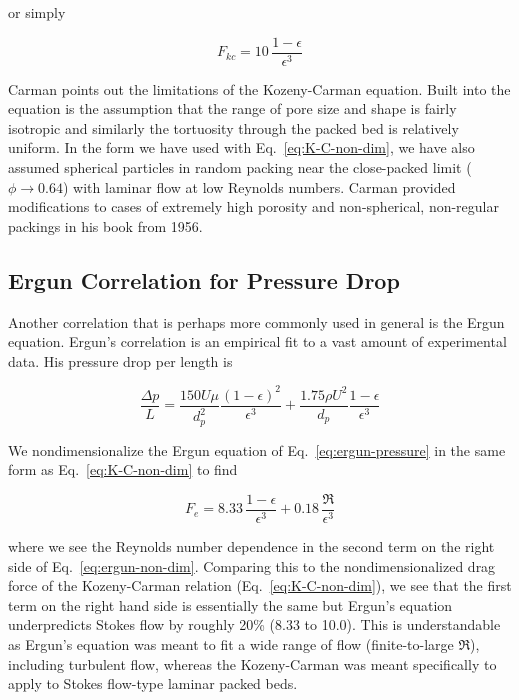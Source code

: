 or simply

\begin{equation}\label{eq:K-C-non-dim}
	F_{kc} = 10\, \frac{1-\epsilon}{\epsilon^3}
\end{equation}

Carman points out\cite{Carman1956} the limitations of the Kozeny-Carman equation. Built into the equation is the assumption that the range of pore size and shape is fairly isotropic and similarly the tortuosity through the packed bed is relatively uniform. In the form we have used with Eq.~\ref{eq:K-C-non-dim}, we have also assumed spherical particles in random packing near the close-packed limit ($\phi \rightarrow 0.64$) with laminar flow at low Reynolds numbers. Carman provided modifications to cases of extremely high porosity and non-spherical, non-regular packings in his book from 1956.\cite{Carman1956}

\subsection{Ergun Correlation for Pressure Drop}

Another correlation that is perhaps more commonly used in general is the Ergun equation.\cite{ergun1952fluid} Ergun's correlation is an empirical fit to a vast amount of experimental data. His pressure drop per length is 

\begin{equation}\label{eq:ergun-pressure}
	\frac{\Delta p}{L} = \frac{150 U \mu}{d_p^2} \frac{(1-\epsilon)^2}{\epsilon^3} + \frac{1.75 \rho U^2}{d_p}\frac{1-\epsilon}{\epsilon^3}
\end{equation}

We nondimensionalize the Ergun equation of Eq.~\ref{eq:ergun-pressure} in the same form as Eq.~\ref{eq:K-C-non-dim} to find

\begin{equation}\label{eq:ergun-non-dim}
	F_e = 8.33 \, \frac{1-\epsilon}{\epsilon^3} + 0.18 \, \frac{\Re}{\epsilon^3}
\end{equation}

where we see the Reynolds number dependence in the second term on the right side of Eq.~\ref{eq:ergun-non-dim}. Comparing this to the nondimensionalized drag force of the Kozeny-Carman relation (Eq.~\ref{eq:K-C-non-dim}), we see that the first term on the right hand side is essentially the same but Ergun's equation underpredicts Stokes flow by roughly 20\% (8.33 to 10.0). This is understandable as Ergun's equation was meant to fit a wide range of flow (finite-to-large $\Re$), including turbulent flow, whereas the Kozeny-Carman was meant specifically to apply to Stokes flow-type laminar packed beds.

